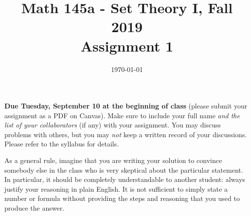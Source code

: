 \documentclass{amsart}
\title[Math 145a, Fall 2019: assignment 1]{Math 145a - Set Theory I, Fall 2019 \\ Assignment 1}
\date{\today}
\theoremstyle{definition}
\begin{document}

\maketitle

\textbf{Due Tuesday, September 10 at the beginning of class} (please submit your assignment as a PDF on Canvas). Make sure to include your full name \emph{and the list of your collaborators} (if any) with your assignment. You may discuss problems with others, but you may \emph{not} keep a written record of your discussions. Please refer to the syllabus for details.

As a general rule, imagine that you are writing your solution to convince somebody else in the class who is very skeptical about the particular statement. In particular, it should be completely understandable to another student: always justify your reasoning in plain English. It is not sufficient to simply state a number or formula without providing the steps and reasoning that you used to produce the answer.
\end{document}
